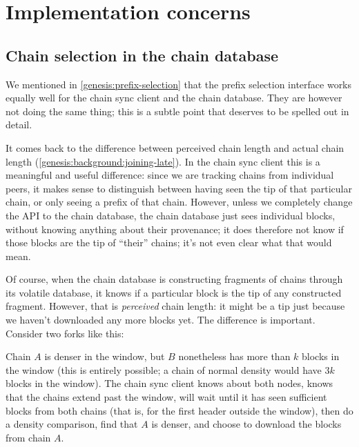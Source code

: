 \section{Implementation concerns}

\subsection{Chain selection in the chain database}
\label{genesis:chain-database}

We mentioned in \cref{genesis:prefix-selection} that the prefix selection
interface works equally well for the chain sync client and the chain database.
They are however not doing the same thing; this is a subtle point that deserves
to be spelled out in detail.

It comes back to the difference between perceived chain length and actual chain
length (\cref{genesis:background:joining-late}). In the chain sync client this
is a meaningful and useful difference: since we are tracking chains from
individual peers, it makes sense to distinguish between having seen the tip of
that particular chain, or only seeing a prefix of that chain. However, unless we
completely change the API to the chain database, the chain database just sees
individual blocks, without knowing anything about their provenance;  it  does
therefore not know if those blocks are the tip of ``their'' chains; it's not
even clear what that would mean.

Of course, when the chain database is constructing fragments of chains through
its volatile database, it knows if a particular block is the tip of any
constructed fragment. However, that is \emph{perceived} chain length: it might
be a tip just because we haven't downloaded any more blocks yet. The difference
is important. Consider two forks like this:
%
\begin{center}
\end{center}
%
Chain $A$ is denser in the window, but $B$ nonetheless has more than $k$ blocks
in the window (this is entirely possible; a chain of normal density would have
$3k$ blocks in the window).  The chain sync client knows about both nodes, knows
that the chains extend past the window, will wait until it has seen sufficient
blocks from both chains (that is, for the first header outside the window), then
do a density comparison, find that $A$ is denser, and choose to download the
blocks from chain $A$.


